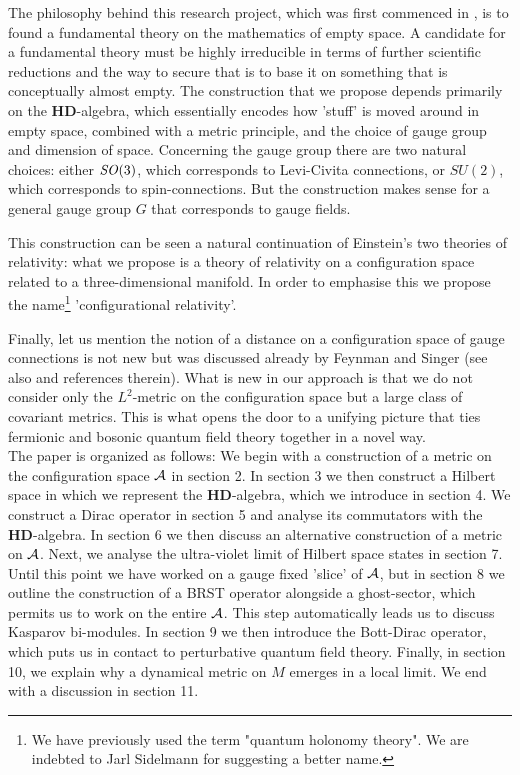 \documentclass[letterpaper,12pt]{article}
\def\ca{{\cal A}}
\begin{document}
\def\SO3{\mathop{\it SO}(3)}


The philosophy behind this research project, which was first commenced in \cite{Aastrup:2005yk}, is to found a fundamental theory on the mathematics of empty space. A candidate for a fundamental theory must be highly irreducible in terms of further scientific reductions and the way to secure that is to base it on something that is conceptually almost empty. The construction that we propose depends primarily  on the $\mathbf{HD}$-algebra, which essentially encodes how 'stuff' is moved around in empty space, combined with a metric principle, and the choice of gauge group and dimension of space. Concerning the gauge group there are two natural choices: either $\SO3$, which corresponds to Levi-Civita connections, or $SU(2)$, which corresponds to spin-connections. But the construction makes sense for a general gauge group $G$ that corresponds to gauge fields.

This construction can be seen a natural continuation of Einstein's two theories of relativity: what we propose is a theory of relativity on a configuration space related to a three-dimensional manifold. In order to emphasise this we propose the name\footnote{We have previously used the term "quantum holonomy theory". We are indebted to Jarl Sidelmann for suggesting a better name.} 'configurational relativity'.







Finally, let us mention the notion of a distance on a configuration space of gauge connections is not new but
was discussed already by Feynman \cite{Feynman:1981ss} and Singer \cite{Singer:1981xw} (see also \cite{Orland:1996hm} and references therein). What is new in our approach is that we do not consider only the $L^2$-metric on the configuration space but a large class of covariant metrics. This is what opens the door to a unifying picture that ties fermionic and bosonic quantum field theory together in a novel way.\\

The paper is organized as follows: We begin with a construction of a metric on the configuration space $\ca$ in section 2. In section 3 we then construct a Hilbert space in which we represent the $\mathbf{HD}$-algebra, which we introduce in section 4. We construct a Dirac operator in section 5 and analyse its commutators with the $\mathbf{HD}$-algebra. In section 6 we then discuss an alternative construction of a metric on $\ca$. Next, we analyse the ultra-violet limit of Hilbert space states in section 7. Until this point we have worked on a gauge fixed 'slice' of $\ca$, but in section 8 we outline the construction of a BRST operator alongside a ghost-sector, which permits us to work on the entire $\ca$. This step automatically leads us to discuss Kasparov bi-modules. In section 9 we then introduce the Bott-Dirac operator, which puts us in contact to perturbative quantum field theory. Finally, in section 10, we explain why a dynamical metric on $M$ emerges in a local limit. We end with a discussion in section 11.
\end{document}
